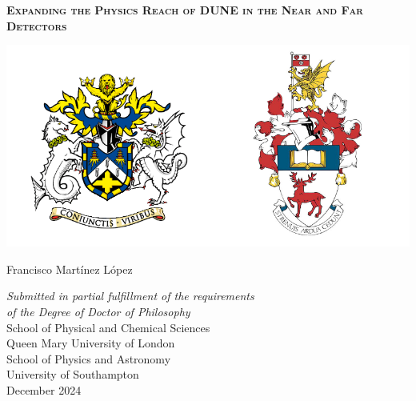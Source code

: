\begin{titlepage}



\begin{center}

\begin{spacing}{2.5}
{\Huge \textsc{\textbf{Expanding the Physics Reach of DUNE in the Near and Far Detectors}}}
\end{spacing}

\vspace{1.0 cm}

\begin{center}
\includegraphics[width=1.0\textwidth]{Images/uni_arms}
\end{center}
\vspace{0.9cm}


{\LARGE Francisco Mart\'{i}nez L\'{o}pez} %

\vspace{1cm}


{\large %
\textit{Submitted in partial fulfillment of the
requirements \\ of the Degree of Doctor of Philosophy}\\
\vspace{0.9 cm}
School of Physical and Chemical Sciences\\
Queen Mary University of London\\
\vspace{0.5 cm}
School of Physics and Astronomy\\
University of Southampton\\
\vspace{0.5cm}
December 2024 %
}

\end{center}



\end{titlepage}

\restoregeometry  %
\doublespacing		%
